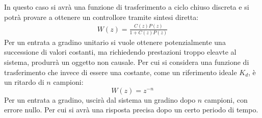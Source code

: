 \documentclass{article}
\numberwithin{equation}{subsection}
\begin{document}
In questo caso si avrà una funzione di trasferimento a ciclo chiuso discreta e si potrà provare a ottenere un controllore tramite sintesi diretta:
\begin{gather}
    W(z)=\displaystyle\frac{C(z)P(z)}{1+C(z)P(z)}
\end{gather}
Per un entrata a gradino unitario si vuole ottenere potenzialmente una successione di valori costanti, ma richiedendo prestazioni troppo eleavte al sistema, 
produrrà un oggetto non causale. 
Per cui si considera una funzione di trasferimento che invece di essere una costante, come un riferimento ideale $K_d$, è un ritardo di $n$ 
campioni:
\begin{equation}
    W(z)=z^{-n}
\end{equation}
Per un entrata a gradino, uscirà dal sistema un gradino dopo $n$ campioni, con errore nullo. Per cui si avrà una risposta precisa dopo un certo periodo di tempo. 
\begin{center}
\end{center}
\end{document}
